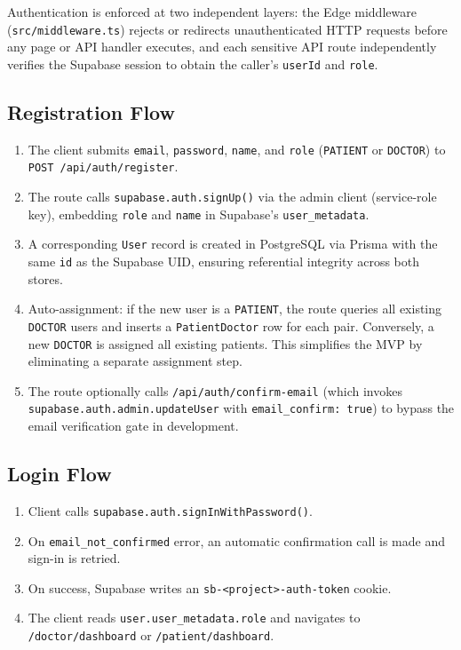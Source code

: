 \documentclass[12pt,a4paper]{report}
\begin{document}
Authentication is enforced at two independent layers: the Edge middleware
(\texttt{src/middleware.ts}) rejects or redirects unauthenticated HTTP
requests before any page or API handler executes, and each sensitive
API route independently verifies the Supabase session to obtain the
caller's \texttt{userId} and \texttt{role}.

\subsection{Registration Flow}

\begin{enumerate}[leftmargin=1.5em, itemsep=0.2em]
  \item The client submits \texttt{email}, \texttt{password}, \texttt{name},
        and \texttt{role} (\texttt{PATIENT} or \texttt{DOCTOR}) to
        \texttt{POST /api/auth/register}.
  \item The route calls \texttt{supabase.auth.signUp()} via the admin
        client (service-role key), embedding \texttt{role} and
        \texttt{name} in Supabase's \texttt{user\_metadata}.
  \item A corresponding \texttt{User} record is created in PostgreSQL
        via Prisma with the same \texttt{id} as the Supabase UID,
        ensuring referential integrity across both stores.
  \item Auto-assignment: if the new user is a \texttt{PATIENT}, the
        route queries all existing \texttt{DOCTOR} users and inserts
        a \texttt{PatientDoctor} row for each pair. Conversely, a new
        \texttt{DOCTOR} is assigned all existing patients. This simplifies
        the MVP by eliminating a separate assignment step.
  \item The route optionally calls \texttt{/api/auth/confirm-email}
        (which invokes \texttt{supabase.auth.admin.updateUser} with
        \texttt{email\_confirm: true}) to bypass the email verification
        gate in development.
\end{enumerate}

\subsection{Login Flow}

\begin{enumerate}[leftmargin=1.5em, itemsep=0.2em]
  \item Client calls \texttt{supabase.auth.signInWithPassword()}.
  \item On \texttt{email\_not\_confirmed} error, an automatic confirmation
        call is made and sign-in is retried.
  \item On success, Supabase writes an \texttt{sb-<project>-auth-token}
        cookie.
  \item The client reads \texttt{user.user\_metadata.role} and navigates
        to \texttt{/doctor/dashboard} or \texttt{/patient/dashboard}.
\end{enumerate}
\end{document}
